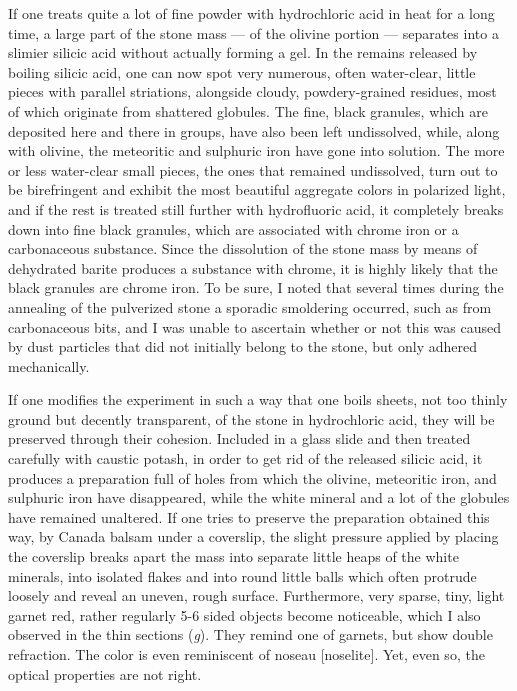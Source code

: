 \documentclass[a4paper, 12pt, oneside]{article}
\begin{document}
If one treats quite a lot of fine powder with hydrochloric acid in heat for a long time, a large part of the stone mass --- of the olivine portion --- separates into a slimier silicic acid without actually forming a gel. In the remains released by boiling silicic acid, one can now spot very numerous, often water-clear, little pieces with parallel striations, alongside cloudy, powdery-grained residues, most of which originate from shattered globules. The fine, black granules, which are deposited here and there in groups, have also been left undissolved, while, along with olivine, the meteoritic and sulphuric iron have gone into solution. The more or less water-clear small pieces, the ones that remained undissolved, turn out to be birefringent and exhibit the most beautiful aggregate colors in polarized light, and if the rest is treated still further with hydrofluoric acid, it completely breaks down into fine black granules, which are associated with chrome iron or a carbonaceous substance. Since the dissolution of the stone mass by means of dehydrated barite produces a substance with chrome, it is highly likely that the black granules are chrome iron. To be sure, I noted that several times during the annealing of the pulverized stone a sporadic smoldering occurred, such as from carbonaceous bits, and I was unable to ascertain whether or not this was caused by dust particles that did not initially belong to the stone, but only adhered mechanically.

If one modifies the experiment in such a way that one boils sheets, not too thinly ground but decently transparent, of the stone in hydrochloric acid, they will be preserved through their cohesion. Included in a glass slide and then treated carefully with caustic potash, in order to get rid of the released silicic acid, it produces a preparation full of holes from which the olivine, meteoritic iron, and sulphuric iron have disappeared, while the white mineral and a lot of the globules have remained unaltered. If one tries to preserve the preparation obtained this way, by Canada balsam under a coverslip, the slight pressure applied by placing the coverslip breaks apart the mass into separate little heaps of the white minerals, into isolated flakes and into round little balls which often protrude loosely and reveal an uneven, rough surface. Furthermore, very sparse, tiny, light garnet red, rather regularly 5-6 sided objects become noticeable, which I also observed in the thin sections (\emph{g}). They remind one of garnets, but show double refraction. The color is even reminiscent of noseau [noselite]. Yet, even so, the optical properties are not right.
\end{document}

